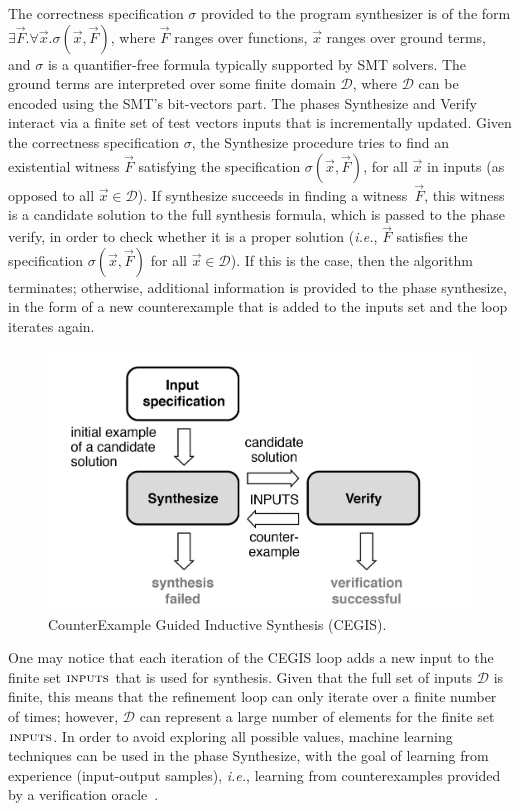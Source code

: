 \documentclass[format=acmsmall, review=false, screen=true]{acmart}
\begin{document}
The correctness specification $\sigma$ provided to the program synthesizer is of the form $\exists \vec{F} .  \forall \vec{x}.  \sigma(\vec{x}, \vec{F})$, where $\vec{F}$ ranges over functions, $\vec{x}$ ranges over ground terms, and $\sigma$ is a quantifier-free formula typically supported by SMT solvers. The ground terms are interpreted over some finite domain $\mathcal{D}$, where $\mathcal{D}$ can be encoded using the SMT's bit-vectors part. The phases {\sc Synthesize} and {\sc Verify} interact via a finite set of test vectors {\sc inputs} that is incrementally updated. Given the correctness specification $\sigma$, the {\sc Synthesize} procedure tries to find an existential witness $\vec{F}$ satisfying the specification $\sigma(\vec{x}, \vec{F})$, for all $\vec{x}$ in {\sc inputs} (as opposed to all $\vec{x} \in \mathcal{D}$). If {\sc synthesize} succeeds in finding a witness~$\vec{F}$, this witness is a candidate solution to the full synthesis formula, which is passed to the phase {\sc verify}, in order to check whether it is a proper solution ({\it i.e.}, $\vec{F}$ satisfies the specification $\sigma(\vec{x}, \vec{F})$ for all $\vec{x}\in\mathcal{D}$). If this is the case, then the algorithm terminates; otherwise, additional information is provided to the phase {\sc synthesize}, in the form of a new counterexample that is added to the {\sc inputs} set and the loop iterates again. 
%
\begin{figure}[h]
	\centering
	\includegraphics[width=\textwidth]{figure3.jpg}
	\caption{CounterExample Guided Inductive Synthesis (CEGIS).}
	\label{Counter-Example-Guided-Inductive-Synthesis}
\end{figure}

One may notice that each iteration of the CEGIS loop adds a new input to the finite set $\text{\sc inputs}$ that is used for synthesis.  Given that the full set of inputs $\mathcal{D}$ is finite, this means that the refinement loop can only iterate over a finite number of times; however, $\mathcal{D}$ can represent a large number of elements for the finite set $\text{\sc inputs}$. In order to avoid exploring all possible values, machine learning techniques can be used in the phase {\sc Synthesize}, with the goal of learning from experience (input-output samples), {\it i.e.}, learning from counterexamples provided by a verification oracle~\cite{Alur13}.
\end{document}
